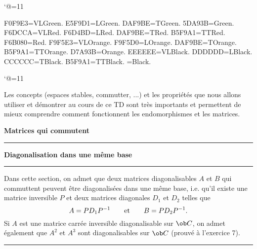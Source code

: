 \catcode`@=11\relax
\def\Api{Mathematicon@Api}%




\DefineRGBcolor F0F9E3=VLGreen.
\DefineRGBcolor E5F9D1=LGreen.
\DefineRGBcolor DAF9BE=TGreen.
\DefineRGBcolor 5DA93B=Green.
\DefineRGBcolor F6DCCA=VLRed.
\DefineRGBcolor F6D4BD=LRed.
\DefineRGBcolor DAF9BE=TRed.
\DefineRGBcolor B5F9A1=TTRed.
\DefineRGBcolor F6B080=Red.
\DefineRGBcolor F9F5E3=VLOrange.
\DefineRGBcolor F9F5D0=LOrange.
\DefineRGBcolor DAF9BE=TOrange.
\DefineRGBcolor B5F9A1=TTOrange.
\DefineRGBcolor D7A93B=Orange.
\DefineRGBcolor EEEEEE=VLBlack.
\DefineRGBcolor DDDDDD=LBlack.
\DefineRGBcolor CCCCCC=TBlack.
\DefineRGBcolor B5F9A1=TTBlack.
=Black.


\catcode`@=11\relax



\vglue-10mm
\bigskip
\bigskip
Les concepts (espaces stables, commutter, ...) et les propri\'et\'es que nous allons utiliser et d\'emontrer au cours de ce TD sont tr\`es importants et permettent de mieux comprendre comment fonctionnent les endomorphismes et les matrices.
\bigskip\bigskip

\centerline{\bf Matrices qui commutent}
\hrule
\bigskip

%
\bigskip

\centerline{\bf Diagonalisation dans une m\^eme base}
\hrule
\bigskip

Dans cette section, on admet que deux matrices diagonalisables  $A$ et $B$ qui commuttent peuvent \^etre 
diagonalis\'ees dans une m\^eme base, i.e. qu'il existe une matrice inversible $P$ 
et deux matrices diagonales $D_1$ et $D_2$ telles que 
$$
A=PD_1P^{-1}\qquad \hbox{et}\qquad B=PD_2P^{-1}.
$$
Si $A$ est une matrice carr\'ee inversible diagonalisable sur $\ob C$, on admet \'egalement que $A^2$ et $A^3$ sont diagonalisables sur $\ob C$ (prouv\'e \`a l'exercice 7). 
\hrule
\bigskip
{}%
\bigskip
{}%
\bigskip
{}%

